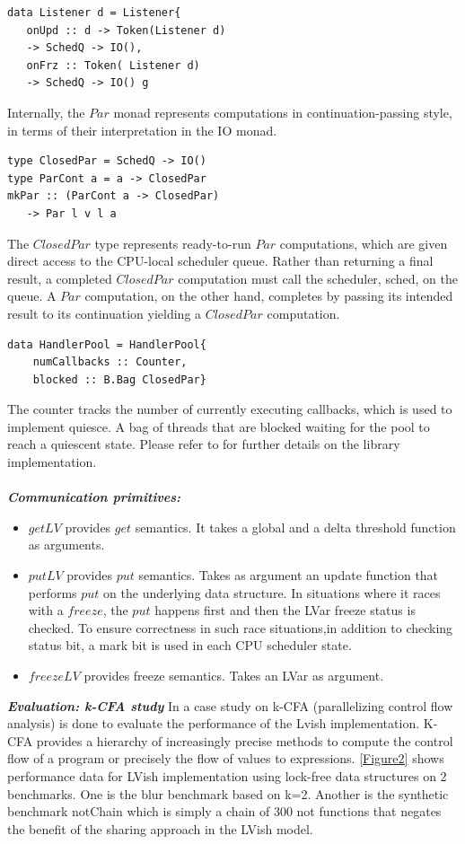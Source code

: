 \documentclass[twocolumn]{article}
\begin{document}
\begin{verbatim}
data Listener d = Listener{
   onUpd :: d -> Token(Listener d)
   -> SchedQ -> IO(),
   onFrz :: Token( Listener d)
   -> SchedQ -> IO() g
\end{verbatim}
Internally, the $Par$ monad represents computations in continuation-passing style, in terms of their interpretation in the IO monad.
\begin{verbatim}
type ClosedPar = SchedQ -> IO()
type ParCont a = a -> ClosedPar
mkPar :: (ParCont a -> ClosedPar)
   -> Par l v l a
\end{verbatim}
The $ClosedPar$ type represents ready-to-run $Par$ computations, which are given direct access to the CPU-local scheduler queue. Rather than returning a final result, a completed $ClosedPar$ computation must call the scheduler, sched, on the queue. A $Par$
computation, on the other hand, completes by passing its intended result to its continuation yielding a $ClosedPar$ computation.
\begin{verbatim}
data HandlerPool = HandlerPool{
    numCallbacks :: Counter,
    blocked :: B.Bag ClosedPar}
\end{verbatim}
The counter tracks the number of currently executing callbacks, which is used to implement quiesce. A bag of threads that are blocked waiting for the pool to reach a quiescent state. Please refer to\cite{lkuper2} for further details on the library implementation.\\ \\
\textbf{\textit{Communication primitives:}}
\begin{itemize}
\item $getLV$ provides $get$ semantics. It takes a global and a delta threshold function as arguments.
\item $putLV$ provides $put$ semantics. Takes as argument an update function that performs $put$ on the underlying data structure. In situations where it races with a $freeze$, the $put$ happens first and then the LVar freeze status is checked.
To ensure correctness in such race situations,in addition to checking status bit, a mark bit is used in each CPU scheduler state.
\item $freezeLV$ provides freeze semantics. Takes an LVar as argument.
\end{itemize}
\textbf{\textit{Evaluation: k-CFA study}} In \cite{lkuper2} a case study on k-CFA (parallelizing control flow analysis) is done to evaluate the performance of the Lvish implementation. K-CFA provides a hierarchy of increasingly precise methods to compute the control flow of a program or precisely the flow of values to expressions. \ref{Figure2} shows performance data for LVish implementation using lock-free data structures on 2 benchmarks. One is the blur benchmark based on k=2. Another is the synthetic benchmark notChain which is simply a chain of 300 not functions that negates the benefit of the sharing approach in the LVish model.\\ \\
\end{document}
